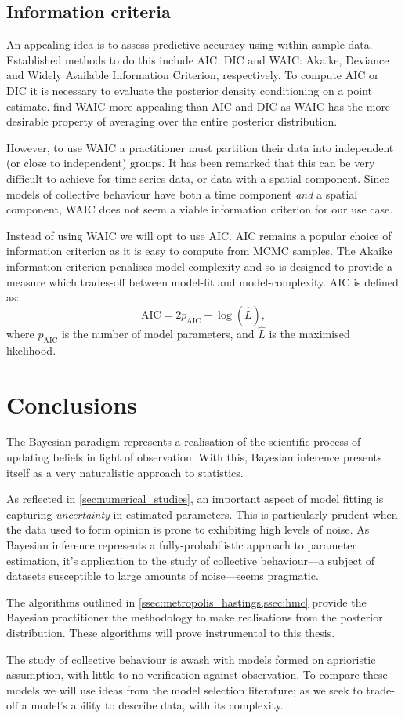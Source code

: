 \subsection{Information criteria}

An appealing idea is to assess predictive accuracy using within-sample data.
Established methods to do this include AIC, DIC and WAIC: Akaike, Deviance and
Widely Available Information Criterion, respectively. To compute AIC or DIC it
is necessary to evaluate the posterior density conditioning on a point
estimate. \textcite{gelman13} find WAIC more appealing than AIC and DIC as
WAIC has the more desirable property of averaging over the entire posterior
distribution.

However, to use WAIC a practitioner must partition their data into independent
(or close to independent) groups. It has been remarked that this can be very
difficult to achieve for time-series data, or data with a spatial component.
Since models of collective behaviour have both a time component \emph{and} a
spatial component, WAIC does not seem a viable information criterion for our
use case.

Instead of using WAIC we will opt to use AIC. AIC remains a popular choice of
information criterion as it is easy to compute from MCMC samples. The Akaike
information criterion penalises model complexity and so is designed to provide
a measure which trades-off between model-fit and model-complexity. AIC is
defined as:
\begin{equation}
\label{eq:aic}
\text{AIC} = 2p_{\text{AIC}} - \log(\widehat{L}),
\end{equation}
where $p_{\text{AIC}}$ is the number of model parameters, and $\widehat{L}$ is
the maximised likelihood.

\section*{Conclusions}

The Bayesian paradigm represents a realisation of the scientific process of
updating beliefs in light of observation. With this, Bayesian inference
presents itself as a very naturalistic approach to statistics.

As reflected in \cref{sec:numerical_studies}, an important aspect of model
fitting is capturing \emph{uncertainty} in estimated parameters. This is
particularly prudent when the data used to form opinion is prone to exhibiting
high levels of noise. As Bayesian inference represents a fully-probabilistic
approach to parameter estimation, it's application to the study of collective
behaviour---a subject of datasets susceptible to large amounts of noise---seems
pragmatic.

The algorithms outlined in \cref{ssec:metropolis_hastings,ssec:hmc} provide the
Bayesian practitioner the methodology to make realisations from the posterior
distribution. These algorithms will prove instrumental to this thesis.

The study of collective behaviour is awash with models formed on aprioristic
assumption, with little-to-no verification against observation. To compare
these models we will use ideas from the model selection literature; as we seek
to trade-off a model's ability to describe data, with its complexity.
